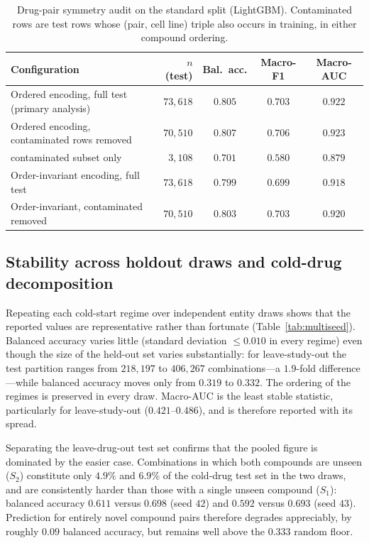\documentclass[11pt]{article}
\begin{document}
\begin{table}[H]
\centering
\caption{Drug-pair symmetry audit on the standard split (LightGBM). Contaminated rows are test rows
whose (pair, cell line) triple also occurs in training, in either compound ordering.}
\label{tab:symmetry}
\small
\begin{tabular}{lrccc}
\toprule
Configuration & $n$ (test) & Bal.\ acc. & Macro-F1 & Macro-AUC \\
\midrule
Ordered encoding, full test (primary analysis) & $73{,}618$ & $0.805$ & $0.703$ & $0.922$ \\
Ordered encoding, contaminated rows removed    & $70{,}510$ & $0.807$ & $0.706$ & $0.923$ \\
\quad contaminated subset only                 & $3{,}108$  & $0.701$ & $0.580$ & $0.879$ \\
Order-invariant encoding, full test            & $73{,}618$ & $0.799$ & $0.699$ & $0.918$ \\
Order-invariant, contaminated removed          & $70{,}510$ & $0.803$ & $0.703$ & $0.920$ \\
\bottomrule
\end{tabular}
\end{table}

\subsection{Stability across holdout draws and cold-drug decomposition}
Repeating each cold-start regime over independent entity draws shows that the reported values are
representative rather than fortunate (Table~\ref{tab:multiseed}). Balanced accuracy varies little
(standard deviation $\leq 0.010$ in every regime) even though the size of the held-out set varies
substantially: for leave-study-out the test partition ranges from $218{,}197$ to $406{,}267$
combinations---a $1.9$-fold difference---while balanced accuracy moves only from $0.319$ to $0.332$.
The ordering of the regimes is preserved in every draw. Macro-AUC is the least stable statistic,
particularly for leave-study-out ($0.421$--$0.486$), and is therefore reported with its spread.

Separating the leave-drug-out test set confirms that the pooled figure is dominated by the easier case.
Combinations in which both compounds are unseen ($S_2$) constitute only $4.9\%$ and $6.9\%$ of the
cold-drug test set in the two draws, and are consistently harder than those with a single unseen
compound ($S_1$): balanced accuracy $0.611$ versus $0.698$ (seed $42$) and $0.592$ versus $0.693$
(seed $43$). Prediction for entirely novel compound pairs therefore degrades appreciably, by roughly
$0.09$ balanced accuracy, but remains well above the $0.333$ random floor.
\end{document}
